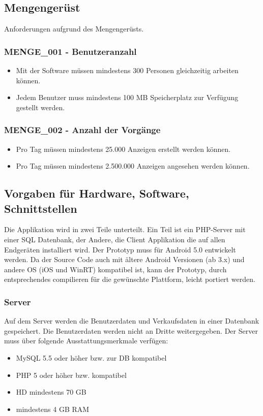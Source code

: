 \documentclass[a4paper,12pt,oneside]{scrartcl}
\begin{document}
\subsection{Mengengerüst}
Anforderungen aufgrund des Mengengerüsts. 

\subsubsection*{MENGE\_001 - Benutzeranzahl}
\begin{itemize}
	\item Mit der Software müssen mindestens 300 Personen gleichzeitig arbeiten können. 
	\item Jedem Benutzer muss mindestens 100 MB Speicherplatz zur Verfügung gestellt werden. 
\end{itemize}

\subsubsection*{MENGE\_002 - Anzahl der Vorgänge }
\begin{itemize}
	\item Pro Tag müssen mindestens 25.000 Anzeigen erstellt werden können. 
	\item Pro Tag müssen mindestens 2.500.000 Anzeigen angesehen werden können.
\end{itemize}


\subsection{Vorgaben für Hardware, Software, Schnittstellen}
Die Applikation wird in zwei Teile unterteilt.
Ein Teil ist ein PHP-Server mit einer SQL Datenbank, der Andere, die Client Applikation die auf allen Endgeräten installiert wird.
Der Prototyp muss für Android 5.0 entwickelt werden. 
Da der Source Code auch mit ältere Android Versionen (ab 3.x) und andere OS (iOS und WinRT) kompatibel ist, kann der Prototyp, durch entsprechendes compilieren für die gewünschte Plattform, leicht portiert werden.

\subsubsection*{Server}
Auf dem Server werden die Benutzerdaten und Verkaufsdaten in einer Datenbank gespeichert.
Die Benutzerdaten werden nicht an Dritte weitergegeben.
Der Server muss über folgende Ausstattungsmerkmale verfügen:
\begin{itemize}
	\item MySQL 5.5 oder höher bzw. zur DB kompatibel
	\item PHP 5 oder höher bzw. kompatibel
	\item HD mindestens 70 GB
	\item mindestens 4 GB RAM
\end{itemize}
\end{document}
